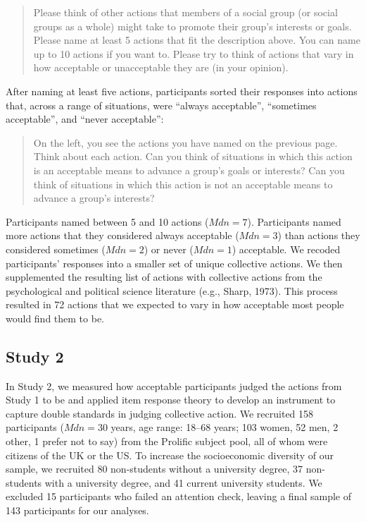 \documentclass[12pt, letterpaper]{article}
\begin{document}
\begin{quote}
Please think of other actions that members of a social group (or social
groups as a whole) might take to promote their group's interests or
goals. Please name at least 5 actions that fit the description above.
You can name up to 10 actions if you want to. Please try to think of
actions that vary in how acceptable or unacceptable they are (in your
opinion).
\end{quote}

\noindent After naming at least five actions, participants sorted their
responses into actions that, across a range of situations, were ``always
acceptable'', ``sometimes acceptable'', and ``never acceptable'':

\begin{quote}
On the left, you see the actions you have named on the previous page.
Think about each action. Can you think of situations in which this
action is an acceptable means to advance a group's goals or interests?
Can you think of situations in which this action is not an acceptable
means to advance a group's interests?
\end{quote}

\noindent Participants named between 5 and 10 actions
(\(\textit{Mdn} = 7\)). Participants named more actions that they
considered always acceptable (\(\textit{Mdn} = 3\)) than actions they
considered sometimes (\(\textit{Mdn} = 2\)) or never
(\(\textit{Mdn} = 1\)) acceptable. We recoded participants' responses
into a smaller set of unique collective actions. We then supplemented
the resulting list of actions with collective actions from the
psychological and political science literature (e.g., Sharp, 1973). This
process resulted in 72 actions that we expected to vary in how
acceptable most people would find them to be.

\hypertarget{study-2}{%
\subsection{Study 2}\label{study-2}}

In Study 2, we measured how acceptable participants judged the actions
from Study 1 to be and applied item response theory to develop an
instrument to capture double standards in judging collective action. We
recruited 158 participants (\(\textit{Mdn} = 30\) years, age range:
18--68 years; 103 women, 52 men, 2 other, 1 prefer not to say) from the
Prolific subject pool, all of whom were citizens of the UK or the US. To
increase the socioeconomic diversity of our sample, we recruited 80
non-students without a university degree, 37 non-students with a
university degree, and 41 current university students. We excluded 15
participants who failed an attention check, leaving a final sample of
143 participants for our analyses.
\end{document}
